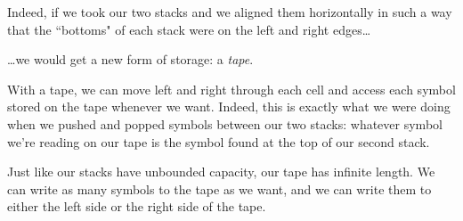 Indeed, if we took our two stacks and we aligned them horizontally in such a way that the ``bottoms" of each stack were on the left and right edges\dots
\begin{center}
\end{center}
\dots we would get a new form of storage: a \emph{tape}.

With a tape, we can move left and right through each cell and access each symbol stored on the tape whenever we want. Indeed, this is exactly what we were doing when we pushed and popped symbols between our two stacks: whatever symbol we're reading on our tape is the symbol found at the top of our second stack.

Just like our stacks have unbounded capacity, our tape has infinite length. We can write as many symbols to the tape as we want, and we can write them to either the left side or the right side of the tape.
\begin{center}
\end{center}

